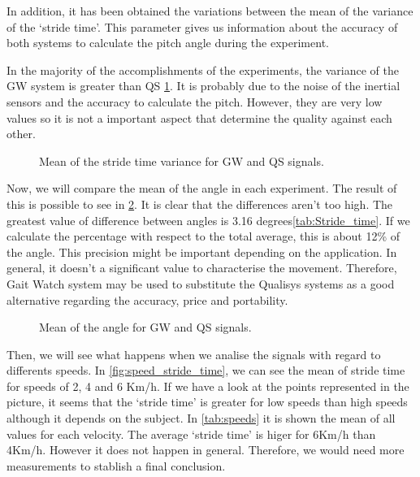 In addition, it has been obtained the variations between the mean of the variance of the ‘stride time’. This parameter gives us information about the accuracy of both systems to calculate the pitch angle during the experiment.

In the majority of the accomplishments of the experiments, the variance of the GW system is greater than QS \ref{fig:var_stride_time}. It is probably due to the noise of the inertial sensors and the accuracy to calculate the pitch. However, they are very low values so it is not a important aspect that determine the quality against each other. 

\begin{figure}[H]
	\centering
	\caption{Mean of the stride time variance for GW and QS signals.}
	\label{fig:var_stride_time}
\end{figure}

Now, we will compare the mean of the angle in each experiment. The result of this is possible to see in \ref{fig:mean_angle}. It is clear that the differences aren’t too high. The greatest value of difference between angles is 3.16 degrees\ref{tab:Stride_time}. If we calculate the percentage with respect to the total average, this is about 12\% of the angle. This precision might be important depending on the application. In general, it doesn’t a significant value to characterise the movement. Therefore, Gait Watch system may be used to substitute the Qualisys systems as a good alternative regarding the accuracy, price and portability.

\begin{figure}[H]
	\centering
	\caption{Mean of the angle for GW and QS signals.}
	\label{fig:mean_angle}
\end{figure}

Then, we will see what happens when we analise the signals with regard to differents speeds. In \ref{fig:speed_stride_time}, we can see the mean of stride time for speeds of 2, 4 and 6 Km/h. If we have a look at the points represented in the picture, it seems that the ‘stride time’ is greater for low speeds than high speeds although it depends on the subject. In \ref{tab:speeds} it is shown the mean of all values for each velocity. The average ‘stride time’ is higer for 6Km/h than 4Km/h. However it does not happen in general. Therefore, we would need more measurements to stablish a final conclusion.

